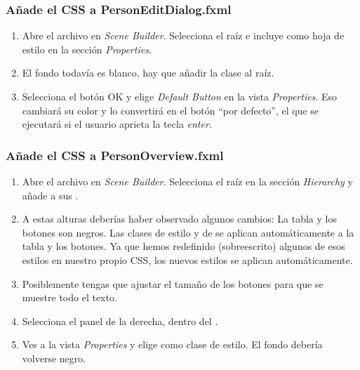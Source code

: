 \subsubsection*{Añade el CSS a PersonEditDialog.fxml}
\begin{enumerate}
    \item Abre el archivo  en \textit{Scene Builder}. Selecciona el  
    raíz e incluye  como hoja de estilo en la sección \textit{Properties}.
    \item El fondo todavía es blanco, hay que añadir la clase  al  raíz.
    \item Selecciona el botón OK y elige \textit{Default Button} en la vista \textit{Properties}. Eso cambiará su 
    color y lo convertirá en el botón “por defecto”, el que se ejecutará si el usuario aprieta la tecla \textit{enter}.
\end{enumerate}
\subsubsection*{Añade el CSS a PersonOverview.fxml}
\begin{enumerate}
    \item Abre el archivo  en \textit{Scene Builder}. Selecciona el  raíz 
    en la sección \textit{Hierarchy} y añade  a sus .
    \item A estas alturas deberías haber observado algunos cambios: La tabla y los botones son negros. 
    Las clases de estilo  y  de  se aplican automáticamente a la tabla y 
    los botones. Ya que hemos redefinido (sobreescrito) algunos de esos estilos en nuestro propio CSS, 
    los nuevos estilos se aplican automáticamente.
    \item Posiblemente tengas que ajustar el tamaño de los botones para que se muestre todo el texto.
    \item Selecciona el panel  de la derecha, dentro del .
    \item Ves a la vista \textit{Properties} y elige  como clase de estilo. 
    El fondo debería volverse negro.
\end{enumerate}


